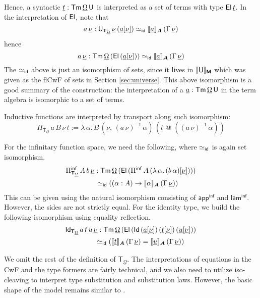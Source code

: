 \documentclass[sigplan,review,anonymous]{acmart}\settopmatter{printfolios=true,printccs=false,printacmref=false}
\makeatletter
\newcommand{\Pii}{\Pi}
\newcommand{\Piinf}{\Pi^{\mathsf{inf}}}
\newcommand{\appinf}{\mathsf{app^{inf}}}
\newcommand{\laminf}{\mathsf{lam^{inf}}}
\newcommand{\appitt}{\mathop{{\scriptstyle @}}}
\newcommand{\bA}{\boldsymbol{A}}
\newcommand{\bM}{\boldsymbol{\mathsf{M}}}
\newcommand{\bT}{\boldsymbol{\mathsf{T}}}
\newcommand{\ul}[1]{\underline{#1}}
\newcommand{\ulOmega}{\ul{\Omega}}
\newcommand{\ulnu}{\ul{\nu}}
\newcommand{\ult}{\ul{t}}
\newcommand{\ulu}{\ul{u}}
\newcommand{\ula}{\ul{a}}
\newcommand{\llb}{\llbracket}
\newcommand{\rrb}{\rrbracket}
\makeatother
\begin{document}
\begin{definition}
Hence, a syntactic $\ult : \Tm\,\ulOmega\,\U$ is interpreted as a set of terms
with type $\El\,\ult$. In the interpretation of $\mathsf{El}$, note that
\[
  a\,\ulnu : \U_{\bT_{\ulOmega}}\,\ulnu\,(\ula[\ulnu]) \simeq_{\id}
                 \llb\ula\rrb_{\bA}\,(\Gamma\,\ulnu)
\]
hence
\[
a\,\ulnu : \Tm\,\ulOmega\,(\El\,(\ula[\ulnu])) \simeq_{\id}
           \llb\ula\rrb_{\bA}\,(\Gamma\,\ulnu)
\]
The $\simeq_{\mathsf{id}}$ above is just an isomorphism of sets, since it lives in
$\llb\U\rrb_{\bM}$ which was given as the flCwF of sets in Section
\ref{sec:universe}. This above isomorphism is a good summary of the
construction: the interpretation of a $\ula : \Tm\,\ulOmega\,\U$ in the term
algebra is isomorphic to a set of terms.

Inductive functions are interpreted by transport along such isomorphism:
\[
  \Pii_{\bT_{\ulOmega}}\,a\,B\,\ulnu\,\ult := \lambda\,\alpha.\,
         B\,(\ulnu,\,(a\,\ulnu)^{-1}\,\alpha)\,(\ult\,\appitt\,((a\,\ulnu)^{-1}\,\alpha))
\]

For the infinitary function space, we need the following, where $\simeq_{\mathsf{id}}$ is
again set isomorphism.
\begin{alignat*}{3}
  & \Piinf_{\bT_{\ulOmega}}\,A\,b\,\ulnu : \Tm\,\ulOmega\,(\El\,(\Piinf\,A\,(\lambda\,\alpha.\,(b\,\alpha)[\ulnu])))\\
  & \hspace{4.2em}\simeq_{\id} ((\alpha : A) \ra \llb\alpha\rrb_{\bA}\,(\Gamma\,\ulnu))
\end{alignat*}
This can be given using the natural isomorphism consisting of $\appinf$ and
$\laminf$. However, the sides are not strictly equal. For the identity type, we
build the following isomorphism using equality reflection.
\begin{alignat*}{3}
  & \Id_{\bT_{\ulOmega}}\,a\,t\,u\,\ulnu : \Tm\,\ulOmega\,(\El\,(\Id\,(\ula[\ulnu])\,(\ult[\ulnu])\,(\ulu[\ulnu]))\\
  & \hspace{4.2em}\simeq_{\id} (\llb\ult\rrb_{\bA}\,(\Gamma\,\ulnu) =   \llb\ulu\rrb_{\bA}\,(\Gamma\,\ulnu))
\end{alignat*}

We omit the rest of the definition of $\bT_{\ulOmega}$. The interpretations of
equations in the CwF and the type formers are fairly technical, and we also
need to utilize iso-cleaving to interpret type substitution and substitution
laws. However, the basic shape of the model remains similar to
\cite{kaposi2019constructing}.
\end{definition}
\end{document}
